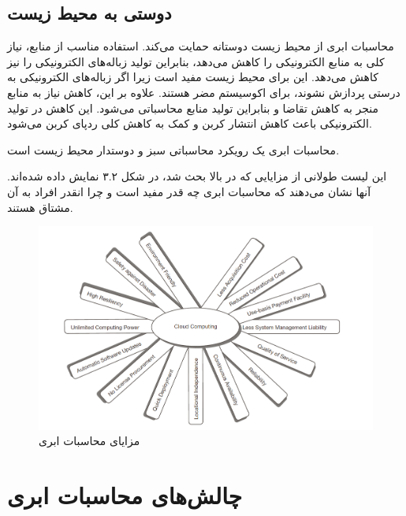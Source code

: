 \documentclass{book}
\begin{document}
    \subsection{دوستی به محیط زیست}

        محاسبات ابری از محیط زیست دوستانه حمایت می‌کند. استفاده مناسب از منابع، نیاز کلی به منابع الکترونیکی را کاهش می‌دهد، بنابراین تولید زباله‌های الکترونیکی را نیز کاهش می‌دهد. این برای محیط زیست مفید است زیرا اگر زباله‌های الکترونیکی به درستی پردازش نشوند، برای اکوسیستم مضر هستند. علاوه بر این، کاهش نیاز به منابع منجر به کاهش تقاضا و بنابراین تولید منابع محاسباتی می‌شود. این کاهش در تولید الکترونیکی باعث کاهش انتشار کربن و کمک به کاهش کلی ردپای کربن می‌شود.

    \begin{addinfo}
        
        محاسبات ابری یک رویکرد محاسباتی سبز و دوستدار محیط زیست است.

    \end{addinfo}

        این لیست طولانی از مزایایی که در بالا بحث شد، در شکل ۳.۲ نمایش داده شده‌اند. آنها نشان می‌دهند که محاسبات ابری چه قدر مفید است و چرا انقدر افراد به آن مشتاق هستند.

    \begin{figure}[htbp]

        \centering
        \includegraphics[width=1\textwidth]{image/fig 3.2.png}
        \caption{مزایای محاسبات ابری}
        \label{fig:fig_3.2}

    \end{figure}

    \section{چالش‌های محاسبات ابری}
\end{document}
